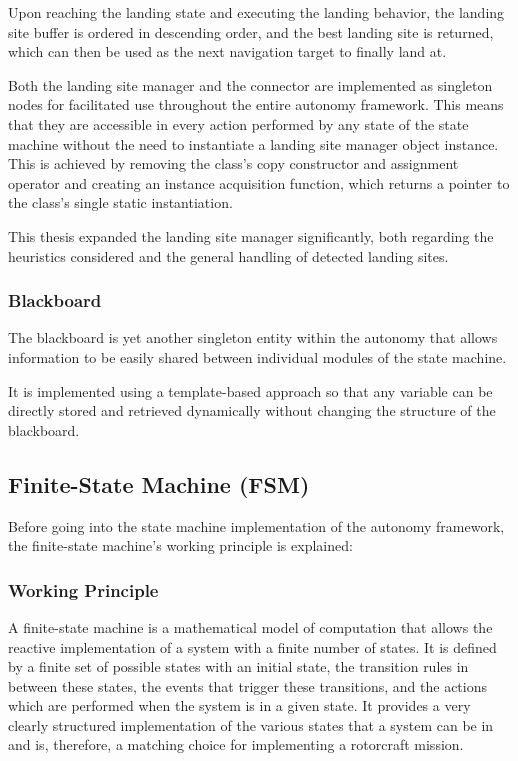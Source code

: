 Upon reaching the landing state and executing the landing behavior, the landing site buffer is ordered in descending order, and the best landing site is returned, which can then be used as the next navigation target to finally land at.

Both the landing site manager and the connector are implemented as singleton nodes for facilitated use throughout the entire autonomy framework. This means that they are accessible in every action performed by any state of the state machine without the need to instantiate a landing site manager object instance. This is achieved by removing the class's copy constructor and assignment operator and creating an instance acquisition function, which returns a pointer to the class's single static instantiation.

This thesis expanded the landing site manager significantly, both regarding the heuristics considered and the general handling of detected landing sites.

\subsubsection{Blackboard}\label{subsubsec:blackboard}

The blackboard is yet another singleton entity within the autonomy that allows information to be easily shared between individual modules of the state machine.

It is implemented using a template-based approach so that any variable can be directly stored and retrieved dynamically without changing the structure of the blackboard.

\subsection{Finite-State Machine (FSM)}

Before going into the state machine implementation of the autonomy framework, the finite-state machine's working principle is explained:

\subsubsection{Working Principle}

A finite-state machine is a mathematical model of computation that allows the reactive implementation of a system with a finite number of states. It is defined by a finite set of possible states with an initial state, the transition rules in between these states, the events that trigger these transitions, and the actions which are performed when the system is in a given state. It provides a very clearly structured implementation of the various states that a system can be in and is, therefore, a matching choice for implementing a rotorcraft mission.

